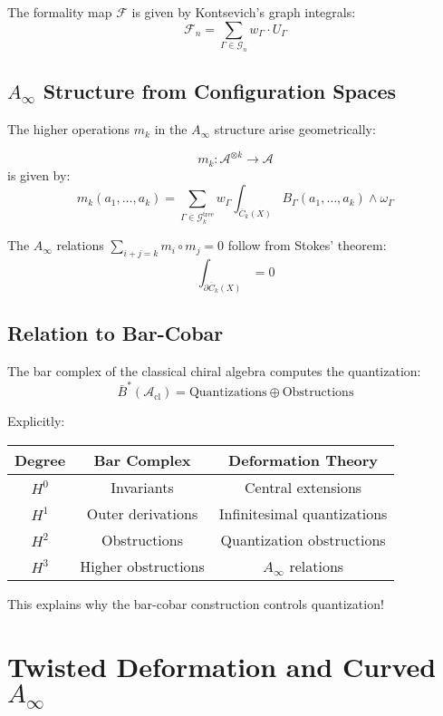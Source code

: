 The formality map $\mathcal{F}$ is given by Kontsevich's graph integrals:
$$\mathcal{F}_n = \sum_{\Gamma \in \mathcal{G}_n} w_\Gamma \cdot U_\Gamma$$

\subsection{$A_\infty$ Structure from Configuration Spaces}

The higher operations $m_k$ in the $A_\infty$ structure arise geometrically:

\begin{proposition}
$$m_k: \mathcal{A}^{\otimes k} \to \mathcal{A}$$
is given by:
$$m_k(a_1, \ldots, a_k) = \sum_{\Gamma \in \mathcal{G}_k^{\text{tree}}} w_\Gamma \int_{\overline{C}_k(X)} B_\Gamma(a_1, \ldots, a_k) \wedge \omega_\Gamma$$
\end{proposition}

The $A_\infty$ relations $\sum_{i+j=k} m_i \circ m_j = 0$ follow from Stokes' theorem:
$$\int_{\partial \overline{C}_k(X)} = 0$$

\subsection{Relation to Bar-Cobar}

\begin{theorem}
The bar complex of the classical chiral algebra computes the quantization:
$$\bar{B}^*(\mathcal{A}_{\text{cl}}) = \text{Quantizations} \oplus \text{Obstructions}$$

Explicitly:
\begin{center}
\begin{tabular}{|c|c|c|}
\hline
Degree & Bar Complex & Deformation Theory \\
\hline
$H^0$ & Invariants & Central extensions \\
$H^1$ & Outer derivations & Infinitesimal quantizations \\
$H^2$ & Obstructions & Quantization obstructions \\
$H^3$ & Higher obstructions & $A_\infty$ relations \\
\hline
\end{tabular}
\end{center}
\end{theorem}

This explains why the bar-cobar construction controls quantization!

\section{Twisted Deformation and Curved $A_\infty$}

